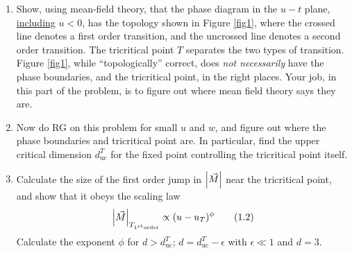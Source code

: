 \documentclass[12pt]{article}
\begin{document}
\begin{enumerate}[label=(\alph*)]
    \item Show, using mean-field theory, that the phase diagram in the $u-t$ plane, \underline{including} $u<0$, has the topology shown in Figure \ref{fig1}, where the crossed line denotes a first order transition, and the uncrossed line denotes a second order transition.
        The tricritical point $T$ separates the two types of transition. Figure \ref{fig1}, while ``topologically'' correct, does \textit{not necessarily} have the phase boundaries, and the tricritical point, in the right places.
        Your job, in this part of the problem, is to figure out where mean field theory says they are.
    \item Now do RG on this problem for small $u$ and $w$, and figure out where the phase boundaries and tricritical point are.
        In particular, find the upper critical dimension $d_{\text{uc}}^T$ for the fixed point controlling the tricritical point itself.
    \item Calculate the size of the first order jump in $\abs{\vec{M}}$ near the tricritical point, and show that it obeys the scaling law
        \begin{equation}
            \abs{\vec{M}}_{T_{1^{st}\text{order}}} \propto (u - u_T)^\phi
            \label{1.2}
            \tag{1.2}
        \end{equation}
        Calculate the exponent $\phi$ for $d>d_{\text{uc}}^T$; $d = d_{\text{uc}}^T - \epsilon$ with $\epsilon \ll 1$ and $d=3$.
\end{enumerate}
\end{document}

